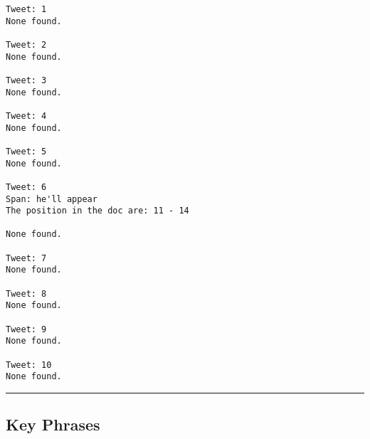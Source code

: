     \begin{Verbatim}[commandchars=\\\{\}]
Tweet: 1
None found.

Tweet: 2
None found.

Tweet: 3
None found.

Tweet: 4
None found.

Tweet: 5
None found.

Tweet: 6
Span: he'll appear
The position in the doc are: 11 - 14

None found.

Tweet: 7
None found.

Tweet: 8
None found.

Tweet: 9
None found.

Tweet: 10
None found.

    \end{Verbatim}

    \begin{center}\rule{0.5\linewidth}{0.5pt}\end{center}

    \hypertarget{key-phrases}{%
\subsection{Key Phrases}\label{key-phrases}}


